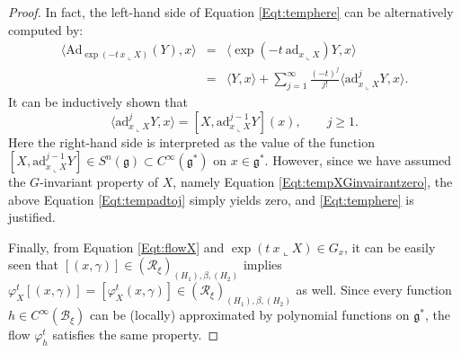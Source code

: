 \documentclass[10pt,a4paper]{amsart}
\newcommand{\Adjointaction}{\mathrm{Ad}}
\newcommand{\Bxi}{\mathcal{B}_{\xi}}
\newcommand{\Cinf}{C^\infty}
\newcommand{\Reducedxi}{\mathcal{R}_\xi}
\newcommand{\galgebra}{\mathfrak{g}}
\newcommand{\gstar}{\mathfrak{g}^*}
\begin{document}
\begin{proof}
 
  In fact, the left-hand side of Equation \eqref{Eqt:temphere} can be alternatively computed by:
  \begin{eqnarray*}
    \langle  \Adjointaction_{\exp(-t ~x\llcorner X)}(Y),x \rangle &=& \langle  \exp( -t ~\mathrm{ad}_{x\llcorner X} ) Y,x \rangle \\
      &=& \langle Y, x \rangle+\sum_{j=1}^\infty \frac{(-t)^j}{j!} \langle \mathrm{ad}^j_{x\llcorner X}Y, x \rangle.
  \end{eqnarray*}
  It can be inductively shown that
  \begin{equation}\label{Eqt:tempadtoj}
   \langle \mathrm{ad}^j_{x\llcorner X}Y, x \rangle= {[X,\mathrm{ad}^{j-1}_{x\llcorner X}Y ]} (x),\qquad j\geqslant 1.
   \end{equation}
  Here the right-hand side is interpreted as the value of the function $[X,\mathrm{ad}^{j-1}_{x\llcorner X}Y ]\in S^n{(\galgebra)}\subset C^\infty(\gstar)$ on $x\in \gstar$. However, since we have assumed the $G$-invariant property of $X$, namely Equation \eqref{Eqt:tempXGinvairantzero}, the above Equation \eqref{Eqt:tempadtoj} simply yields zero, and \eqref{Eqt:temphere} is justified.
  
  Finally, from Equation \eqref{Eqt:flowX}  and $\exp(t ~x\llcorner X) \in G_x$, it can be easily seen that   $[(x,\gamma)]\in (\Reducedxi)_{(H_1),\beta,(H_2)}$ implies $\varphi^t_X[(x,\gamma)]=[\varphi^t_X(x,\gamma)]\in (\Reducedxi)_{(H_1),\beta,(H_2)}$ as well. Since every function $h \in \Cinf(\Bxi)$ can be (locally) approximated by  polynomial functions on $ \gstar$, the flow $\varphi^t_h$ satisfies the same property.
   
\end{proof}
\end{document}
